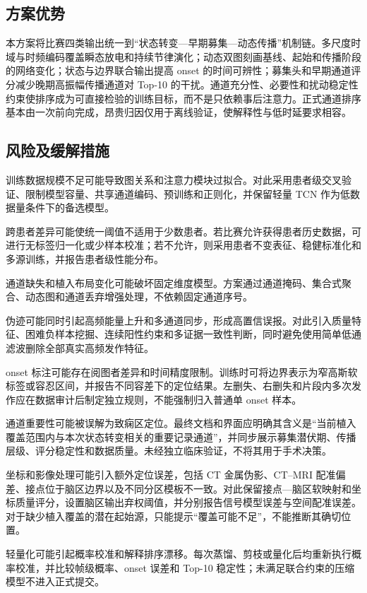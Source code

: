 \subsection{方案优势}

本方案将比赛四类输出统一到“状态转变—早期募集—动态传播”机制链。多尺度时域与时频编码覆盖瞬态放电和持续节律演化；动态双图刻画基线、起始和传播阶段的网络变化；状态与边界联合输出提高 onset 的时间可辨性；募集头和早期通道评分减少晚期高振幅传播通道对 Top-10 的干扰。通道充分性、必要性和扰动稳定性约束使排序成为可直接检验的训练目标，而不是只依赖事后注意力。正式通道排序基本由一次前向完成，昂贵归因仅用于离线验证，使解释性与低时延要求相容。

\subsection{风险及缓解措施}

训练数据规模不足可能导致图关系和注意力模块过拟合。对此采用患者级交叉验证、限制模型容量、共享通道编码、预训练和正则化，并保留轻量 TCN 作为低数据量条件下的备选模型。

跨患者差异可能使统一阈值不适用于少数患者。若比赛允许获得患者历史数据，可进行无标签归一化或少样本校准；若不允许，则采用患者不变表征、稳健标准化和多源训练，并报告患者级性能分布。

通道缺失和植入布局变化可能破坏固定维度模型。方案通过通道掩码、集合式聚合、动态图和通道丢弃增强处理，不依赖固定通道序号。

伪迹可能同时引起高频能量上升和多通道同步，形成高置信误报。对此引入质量特征、困难负样本挖掘、连续阳性约束和多证据一致性判断，同时避免使用简单低通滤波删除全部真实高频发作特征。

onset 标注可能存在阅图者差异和时间精度限制。训练时可将边界表示为窄高斯软标签或容忍区间，并报告不同容差下的定位结果。左删失、右删失和片段内多次发作应在数据审计后制定独立规则，不能强制归入普通单 onset 样本。

通道重要性可能被误解为致痫区定位。最终文档和界面应明确其含义是“当前植入覆盖范围内与本次状态转变相关的重要记录通道”，并同步展示募集潜伏期、传播层级、评分稳定性和数据质量。未经独立临床验证，不将其用于手术决策。

坐标和影像处理可能引入额外定位误差，包括 CT 金属伪影、CT--MRI 配准偏差、接点位于脑区边界以及不同分区模板不一致。对此保留接点—脑区软映射和坐标质量评分，设置脑区输出弃权阈值，并分别报告信号模型误差与空间配准误差。对于缺少植入覆盖的潜在起始源，只能提示“覆盖可能不足”，不能推断其确切位置。

轻量化可能引起概率校准和解释排序漂移。每次蒸馏、剪枝或量化后均重新执行概率校准，并比较帧级概率、onset 误差和 Top-10 稳定性；未满足联合约束的压缩模型不进入正式提交。

